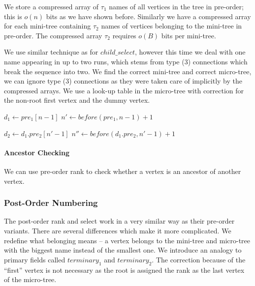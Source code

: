 We store a compressed array of $\tau_1$ names of all vertices in the tree in pre-order; this is $o(n)$ bits as we have shown before.
Similarly we have a compressed array for each mini-tree containing $\tau_2$ names of vertices belonging to the mini-tree in pre-order.
The compressed array $\tau_2$ requires $o(B)$ bits per mini-tree.

We use similar technique as for $child\_select$, however this time we deal with one name appearing in up to two runs, which stems from type (3) connections which break the sequence into two.
We find the correct mini-tree and correct micro-tree, we can ignore type (3) connections as they were taken care of implicitly by the compressed arrays.
We use a look-up table in the micro-tree with correction for the non-root first vertex and the dummy vertex.

\begin{algorithmic}
	\State $d_1 \gets pre_1[n - 1]$ 
	\State $n' \gets before(pre_1, n - 1) + 1$

	\State $d_2 \gets d_1.pre_2[n' - 1]$ 
	\State $n'' \gets before(d_1.pre_2, n' - 1) + 1$
	
	 
	\State {}
\EndFunction
\end{algorithmic}

\paragraph{Ancestor Checking}

We can use pre-order rank to check whether a vertex is an ancestor of another vertex.

\begin{algorithmic}
	\State {}
\EndFunction
\end{algorithmic}

\subsubsection{Post-Order Numbering}

The post-order rank and select work in a very similar way as their pre-order variants.
There are several differences which make it more complicated.
We redefine what belonging means -- a vertex belongs to the mini-tree and micro-tree with the biggest name instead of the smallest one.
We introduce an analogy to primary fields called $terminary_1$ and $terminary_2$.
The correction because of the ``first'' vertex is not necessary as the root is assigned the rank as the last vertex of the micro-tree.

